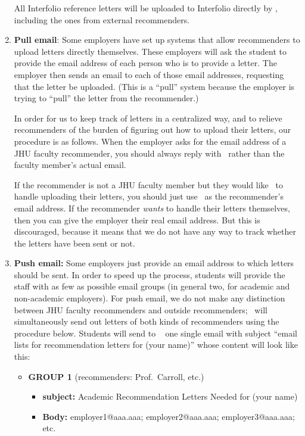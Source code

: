 \documentclass{\econtex}
\begin{document}
\begin{enumerate}
  All Interfolio reference letters will be uploaded to Interfolio directly by {\JMStaffName}, including the ones from external recommenders.

\item \textbf{Pull email}: Some employers have set up systems that allow
  recommenders to upload letters directly themselves.  These employers
  will ask the student to provide the email address of each person who
  is to provide a letter.  The employer then sends an email to each of
  those email addresses, requesting that the letter be uploaded.
  (This is a ``pull'' system because the employer is trying to
  ``pull'' the letter from the recommender.)

  In order for us to keep track of letters in a centralized way, and
  to relieve recommenders of the burden of figuring out how to
  upload their letters, our procedure is as follows.  When the
  employer asks for the email address of a JHU faculty recommender, you should
  always reply with \jmstaffemail~rather than the faculty member's
  actual email.

  If the recommender is not a JHU faculty member but they would like \JMStaff~to handle uploading their letters, you should just use \jmstaffemail~as the recommender's email address.  If the recommender \textit{wants} to handle their letters themselves, then you can give the employer their real email address.  But this is discouraged, because it means that we do not have any way to track whether the letters have been sent or not.

\item \textbf{Push email:} Some employers just provide an email address
  to which letters should be sent.  In order to speed up the process,
  students will provide the staff with as few as possible email groups
  (in general two, for academic and non-academic employers). For push email, we do not 
  make any distinction between JHU faculty recommenders and outside recommenders; \JMStaff~will
  simultaneously send out letters of both kinds of recommenders using the procedure below.  Students will send to \jmstaffemail~ one single email
  with subject ``email lists for recommendation letters for (your
  name)'' whose content will look like this: \small
  \begin{itemize}
  \item \textbf{ GROUP 1} (recommenders: Prof.\ Carroll, etc.)
    \begin{itemize}
    \item \textbf{ subject:} Academic Recommendation Letters Needed for (your name)
    \item \textbf{ Body:} employer1@aaa.aaa; employer2@aaa.aaa; employer3@aaa.aaa; etc.
    \end{itemize}


\end{itemize}
\end{enumerate}
\end{document}
